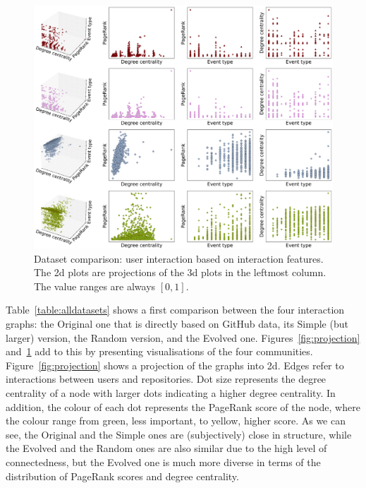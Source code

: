 \documentclass[dvipsnames,format=sigconf,anonymous=False,review=false, balance=false]{acmart}
\begin{document}
\begin{figure}
\centering

 \:%
 \includegraphics[width=0.961\linewidth,trim=0 0 0 0,clip]{3Dplus2D_All_v3.png}%
\vspace{-3mm}%
\caption{Dataset comparison: user interaction based on interaction features. The 2d plots are projections of the 3d plots in the leftmost column. The value ranges are always $\left[0,1\right]$.}
\label{fig:featurespace}
\end{figure}

Table~\ref{table:alldatasets} shows a first comparison between the four interaction graphs: the Original one that is directly based on GitHub data, its Simple (but larger) version, the Random version, and the Evolved one. 
Figures~\ref{fig:projection} and~\ref{fig:featurespace} add to this by presenting visualisations of the four communities. 
Figure~\ref{fig:projection} shows a projection of the graphs into 2d. Edges refer to interactions between users and repositories. 
Dot size represents the degree centrality of a node with larger dots indicating a higher degree centrality. 
In addition, the colour of each dot represents the PageRank score of the node, where the colour range from green, less important, to yellow, higher score.
As we can see, the Original and the Simple ones are (subjectively) close in structure, while the Evolved and the Random ones are also similar due to the high level of connectedness, but the Evolved one is much more diverse in terms of the distribution of PageRank scores and degree centrality. 
\end{document}
